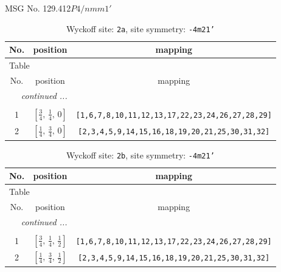 \documentclass[fleqn,8pt]{jsarticle}
\begin{document}
\setcounter{MaxMatrixCols}{32}

\renewcommand{\tablename}{Table~}
\renewcommand{\figurename}{Figure~}
\begin{center}
\LARGE
MSG No. 129.412\quad$P4/nmm1'$
\end{center}
\renewcommand{\arraystretch}{1.2}
\begin{longtable}{ccc}
\caption{Wyckoff site: {\tt 2a}, site symmetry: {\tt -4m21'}}
 \\
 \hline \hline
No. & position & mapping \\ \hline \endfirsthead

\multicolumn{2}{l}{\tablename\ \thetable{}} \\
 \hline \hline
No. & position & mapping \\ \hline \endhead

 \hline \hline
\multicolumn{2}{r}{\footnotesize\it continued ...} \\ \endfoot

 \hline \hline
\multicolumn{2}{r}{} \\ \endlastfoot

1 & $\left[ \frac{3}{4},\, \frac{1}{4},\, 0 \right]$ & {\tt [1,6,7,8,10,11,12,13,17,22,23,24,26,27,28,29]} \\ \hline
2 & $\left[ \frac{1}{4},\, \frac{3}{4},\, 0 \right]$ & {\tt [2,3,4,5,9,14,15,16,18,19,20,21,25,30,31,32]} \\
\end{longtable}
\renewcommand{\arraystretch}{1.2}
\begin{longtable}{ccc}
\caption{Wyckoff site: {\tt 2b}, site symmetry: {\tt -4m21'}}
 \\
 \hline \hline
No. & position & mapping \\ \hline \endfirsthead

\multicolumn{2}{l}{\tablename\ \thetable{}} \\
 \hline \hline
No. & position & mapping \\ \hline \endhead

 \hline \hline
\multicolumn{2}{r}{\footnotesize\it continued ...} \\ \endfoot

 \hline \hline
\multicolumn{2}{r}{} \\ \endlastfoot

1 & $\left[ \frac{3}{4},\, \frac{1}{4},\, \frac{1}{2} \right]$ & {\tt [1,6,7,8,10,11,12,13,17,22,23,24,26,27,28,29]} \\ \hline
2 & $\left[ \frac{1}{4},\, \frac{3}{4},\, \frac{1}{2} \right]$ & {\tt [2,3,4,5,9,14,15,16,18,19,20,21,25,30,31,32]} \\
\end{longtable}
\end{document}
